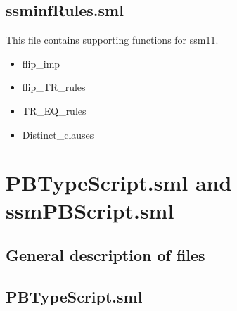 
\subsection{ssminfRules.sml}
\label{sec:ssminfrules.sml-1}

This file contains supporting functions for ssm11.

\begin{itemize}
\item flip_imp
\item flip_TR_rules
\item TR_EQ_rules
\item Distinct_clauses
  \end{itemize}


\section{PBTypeScript.sml and ssmPBScript.sml}
\label{sec:pbtyp-ssmpbscr-1}


\subsection{General description of files}
\label{sec:gener-descr-files-3}



\subsection{PBTypeScript.sml}
\label{sec:pbtypescript.sml-1}




